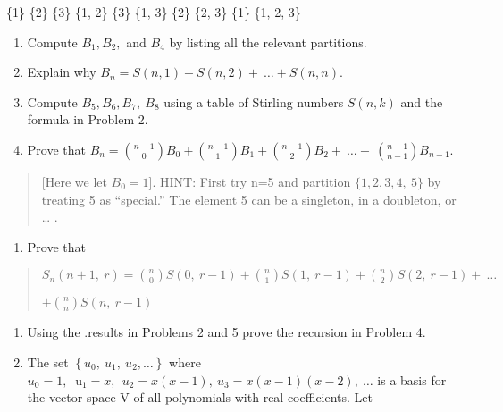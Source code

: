 \{1\} \{2\} \{3\} \{1, 2\} \{3\} \{1, 3\} \{2\} \{2, 3\} \{1\} \{1, 2,
3\}
\begin{enumerate}
\def\labelenumi{\arabic{enumi}.}

\item
  Compute \(B_{1},B_{2},\) and \(B_{4}\) by listing all the relevant
  partitions.
\item
  Explain why
  \(B_{n} = S\left( n,1 \right) + S\left( n,2 \right) + \ \ldots + S(n,n)\).
\item
  Compute \(B_{5},B_{6},B_{7},\ B_{8}\) using a table of Stirling
  numbers \(S(n,k)\) and the formula in Problem 2.
\item
  Prove that \(B_{n} =
\binom{  n - 1}{  0}
B_{0} +
\binom{n - 1}{1}
B_{1} +
\binom{n - 1}{2}
B_{2} + \ \ldots + \
\binom{n - 1}{n - 1}
B_{n - 1}\).

\end{enumerate}
\begin{quote}
{[}Here we let \(B_{0} = 1\){]}. HINT: First try n=5 and partition
\(\{ 1,2,3,4,\ 5\}\) by treating 5 as ``special.'' The element 5 can be
a singleton, in a doubleton, or \ldots{} .

\end{quote}
\begin{enumerate}
\def\labelenumi{\arabic{enumi}.}

\item
  Prove that

\end{enumerate}
\begin{quote}
\(S_{n}\left( n + 1,\ r \right) =
\binom{n}{0}
S\left( 0,\ r - 1 \right) +
\binom{n}{1}
S\left( 1,\ r - 1 \right) +
\binom{n}{2}
S\left( 2,\ r - 1 \right) + \ \ldots\)

\(+
\binom{n}{n}
S(n,\ r - 1)\)

\end{quote}
\begin{enumerate}
\def\labelenumi{\arabic{enumi}.}

\item
  Using the .results in Problems 2 and 5 prove the recursion in Problem
  4.
\item
  The set \(\left\{ u_{0},\ u_{1},\ u_{2},\ldots \right\}\) where
  \(u_{0} = 1,\ \text{\ u}_{1} = x,\ \ u_{2} = x\left( x - 1 \right),\ u_{3} = x\left( x - 1 \right)\left( x - 2 \right),\ \ldots\)
  is a basis for the vector space V of all polynomials with real
  coefficients. Let

\end{enumerate}
